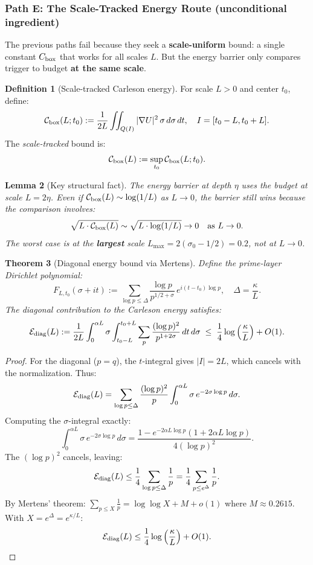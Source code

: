 \documentclass[11pt]{article}
\newtheorem{theorem}{Theorem}
\newtheorem{lemma}[theorem]{Lemma}
\theoremstyle{definition}
\newtheorem{definition}[theorem]{Definition}
\theoremstyle{remark}
\theoremstyle{definition}
\begin{document}
\subsubsection*{Path E: The Scale-Tracked Energy Route (unconditional ingredient)}

The previous paths fail because they seek a \textbf{scale-uniform} bound: a single constant $C_{\rm box}$ that works for all scales $L$. But the energy barrier only compares trigger to budget \textbf{at the same scale}.

\begin{definition}[Scale-tracked Carleson energy]\label{def:scale-tracked}
For scale $L > 0$ and center $t_0$, define:
\[
  \mathcal{C}_{\rm box}(L; t_0) := \frac{1}{2L}\iint_{Q(I)} |\nabla U|^2\,\sigma\,d\sigma\,dt, \quad I = [t_0-L, t_0+L].
\]
The \emph{scale-tracked} bound is:
\[
  \mathcal{C}_{\rm box}(L) := \sup_{t_0} \mathcal{C}_{\rm box}(L; t_0).
\]
\end{definition}

\begin{lemma}[Key structural fact]\label{lem:scale-tracked-key}
The energy barrier at depth $\eta$ uses the budget at scale $L = 2\eta$. Even if $\mathcal{C}_{\rm box}(L) \sim \log(1/L)$ as $L \to 0$, the barrier still wins because the comparison involves:
\[
  \sqrt{L \cdot \mathcal{C}_{\rm box}(L)} \sim \sqrt{L \cdot \log(1/L)} \to 0 \quad \text{as } L \to 0.
\]
The worst case is at the \textbf{largest} scale $L_{\max} = 2(\sigma_0 - 1/2) = 0.2$, not at $L \to 0$.
\end{lemma}

\begin{theorem}[Diagonal energy bound via Mertens]\label{thm:diagonal-mertens}
Define the prime-layer Dirichlet polynomial:
\[
  F_{L,t_0}(\sigma+it) := \sum_{\log p \le \Delta} \frac{\log p}{p^{1/2+\sigma}}\,e^{i(t-t_0)\log p}, \quad \Delta = \frac{\kappa}{L}.
\]
The diagonal contribution to the Carleson energy satisfies:
\begin{equation}\label{eq:diagonal-mertens}
  \mathcal{E}_{\rm diag}(L) := \frac{1}{2L}\int_0^{\alpha L}\sigma\int_{t_0-L}^{t_0+L} \sum_{p} \frac{(\log p)^2}{p^{1+2\sigma}}\,dt\,d\sigma 
  \;\le\; \frac{1}{4}\log\left(\frac{\kappa}{L}\right) + O(1).
\end{equation}
\end{theorem}
\begin{proof}
For the diagonal ($p = q$), the $t$-integral gives $|I| = 2L$, which cancels with the normalization. Thus:
\[
  \mathcal{E}_{\rm diag}(L) = \sum_{\log p \le \Delta} \frac{(\log p)^2}{p} \int_0^{\alpha L} \sigma\,e^{-2\sigma\log p}\,d\sigma.
\]
Computing the $\sigma$-integral exactly:
\[
  \int_0^{\alpha L} \sigma\,e^{-2\sigma\log p}\,d\sigma = \frac{1 - e^{-2\alpha L \log p}(1 + 2\alpha L \log p)}{4(\log p)^2}.
\]
The $(\log p)^2$ cancels, leaving:
\[
  \mathcal{E}_{\rm diag}(L) \le \frac{1}{4}\sum_{\log p \le \Delta} \frac{1}{p} = \frac{1}{4}\sum_{p \le e^{\Delta}} \frac{1}{p}.
\]
By Mertens' theorem: $\sum_{p \le X} \frac{1}{p} = \log\log X + M + o(1)$ where $M \approx 0.2615$. With $X = e^{\Delta} = e^{\kappa/L}$:
\[
  \mathcal{E}_{\rm diag}(L) \le \frac{1}{4}\log\left(\frac{\kappa}{L}\right) + O(1). \qedhere
\]
\end{proof}
\end{document}
